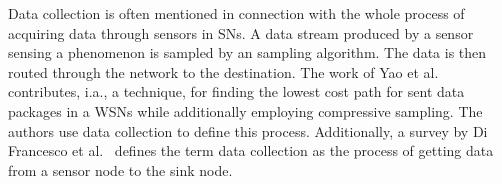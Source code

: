 

\par
Data collection is often mentioned in connection with the whole process of
acquiring data through sensors in \acp{SN}.
A data stream produced by a sensor sensing a phenomenon is sampled by an
sampling algorithm. The data is then routed through the network to the
destination. The work of Yao et al.~\cite{yao2015edal} contributes, i.a., a
technique, for finding the lowest cost path for sent data packages in a
\acp{WSN} while additionally employing compressive sampling. The authors use
data collection to define this process. Additionally, a survey by Di Francesco
et al.~\cite{di2011data} defines the term data collection as the process of
getting data from a sensor node to the sink node.
\par

